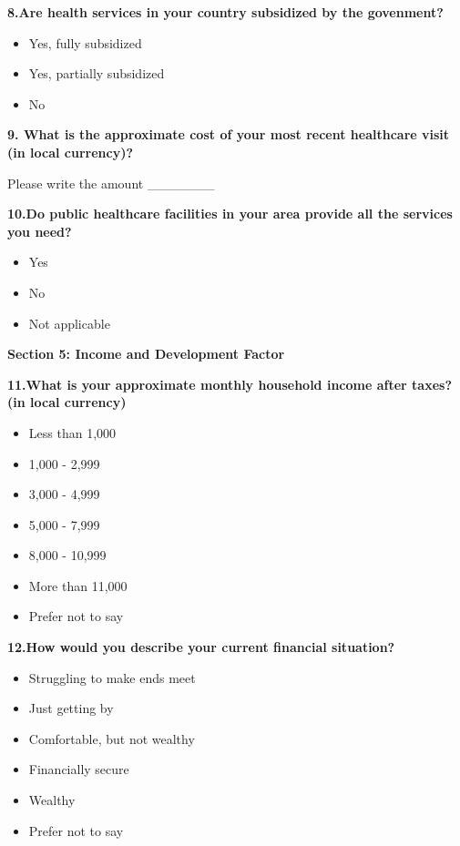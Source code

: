 \documentclass[
  letterpaper,
  DIV=11,
  numbers=noendperiod]{scrartcl}
\providecommand{\tightlist}{%
  \setlength{\itemsep}{0pt}\setlength{\parskip}{0pt}}\usepackage{longtable,booktabs,array}
\begin{document}
\textbf{8.Are health services in your country subsidized by the
govenment?}

\begin{itemize}
\tightlist
\item
  Yes, fully subsidized
\item
  Yes, partially subsidized
\item
  No
\end{itemize}

\textbf{9. What is the approximate cost of your most recent healthcare
visit (in local currency)?}

Please write the amount \_\_\_\_\_\_\_

\textbf{10.Do public healthcare facilities in your area provide all the
services you need?}

\begin{itemize}
\tightlist
\item
  Yes
\item
  No
\item
  Not applicable
\end{itemize}

\textbf{Section 5: Income and Development Factor}

\textbf{11.What is your approximate monthly household income after
taxes?(in local currency)}

\begin{itemize}
\tightlist
\item
  Less than 1,000
\item
  1,000 - 2,999
\item
  3,000 - 4,999
\item
  5,000 - 7,999
\item
  8,000 - 10,999
\item
  More than 11,000
\item
  Prefer not to say
\end{itemize}

\textbf{12.How would you describe your current financial situation?}

\begin{itemize}
\tightlist
\item
  Struggling to make ends meet
\item
  Just getting by
\item
  Comfortable, but not wealthy
\item
  Financially secure
\item
  Wealthy
\item
  Prefer not to say
\end{itemize}
\end{document}
